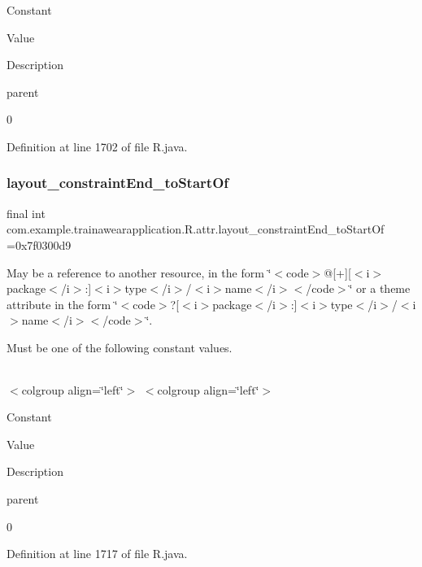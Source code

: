 Constant

Value

Description 

parent

0

Definition at line 1702 of file R.\+java.

\mbox{\label{classcom_1_1example_1_1trainawearapplication_1_1_r_1_1attr_abd8a857255a342b93f6fd3c6347f6607}} 
\subsubsection{\texorpdfstring{layout\_constraintEnd\_toStartOf}{layout\_constraintEnd\_toStartOf}}
{\footnotesize\ttfamily final int com.\+example.\+trainawearapplication.\+R.\+attr.\+layout\+\_\+constraint\+End\+\_\+to\+Start\+Of =0x7f0300d9\hspace{0.3cm}{\ttfamily [static]}}

May be a reference to another resource, in the form \char`\"{}$<$code$>$@\mbox{[}+\mbox{]}\mbox{[}$<$i$>$package$<$/i$>$\+:\mbox{]}$<$i$>$type$<$/i$>$/$<$i$>$name$<$/i$>$$<$/code$>$\char`\"{} or a theme attribute in the form \char`\"{}$<$code$>$?\mbox{[}$<$i$>$package$<$/i$>$\+:\mbox{]}$<$i$>$type$<$/i$>$/$<$i$>$name$<$/i$>$$<$/code$>$\char`\"{}. 

Must be one of the following constant values.

\tabulinesep=1mm
\begin{longtabu}spread 0pt [c]{*{0}{|X[-1]}|}
\hline
\end{longtabu}
$<$colgroup align=\char`\"{}left\char`\"{}$>$ $<$colgroup align=\char`\"{}left\char`\"{}$>$ 

Constant

Value

Description 

parent

0

Definition at line 1717 of file R.\+java.

\mbox{\label{classcom_1_1example_1_1trainawearapplication_1_1_r_1_1attr_a5375a3b18c2ac1e6d41bbbd181594fdd}} 
